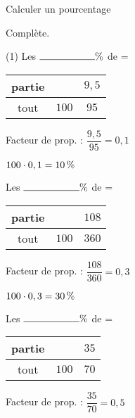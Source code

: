 \documentclass[a4paper,11pt]{report}
\begin{document}
\begin{resolu}{Calculer un pourcentage}{
    Complète.
    \begin{tasks}(1)
    \task Les $\ligne{2}\%$ de  = 

    \begin{minipage}[]{0.3\textwidth}
     \begin{tabular}{|c|c|c|}
         \hline
         partie &  & $9,5$ \\ \hline
         tout & $100$ & $95$ \\ \hline
     \end{tabular}
     \end{minipage}
     \begin{minipage}[]{0.7\textwidth}
        Facteur de prop. : $\dfrac{9,5}{95}=0,1$
        
        $100\cdot0,1=\tunit{10}{\%}$
     \end{minipage}
    
    \task Les $\ligne{2}\%$ de  = 
    
    \begin{minipage}[]{0.3\textwidth}
     \begin{tabular}{|c|c|c|}
         \hline
         partie &  & $108$ \\ \hline
         tout & $100$ & $360$ \\ \hline
     \end{tabular}
     \end{minipage}
     \begin{minipage}[]{0.7\textwidth}
     Facteur de prop. : $\dfrac{108}{360}=0,3$
     
        $100\cdot0,3=\tunit{30}{\%}$
     \end{minipage}
    
    \task Les $\ligne{2}\%$ de  =  

    \begin{minipage}[]{0.3\textwidth}
     \begin{tabular}{|c|c|c|}
         \hline
         partie &  & $35$ \\ \hline
         tout & $100$ & $70$ \\ \hline
     \end{tabular}
     \end{minipage}
     \begin{minipage}[]{0.7\textwidth}
     Facteur de prop. : $\dfrac{35}{70}=0,5$
     

\end{minipage}
\end{tasks}}
\end{resolu}
\end{document}
